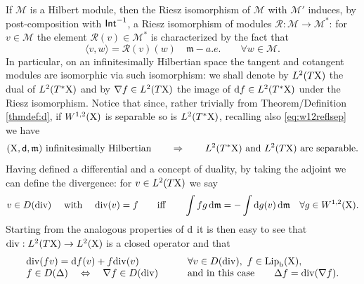\documentclass[11pt]{article}
\numberwithin{equation}{section}
\newcommand{\X}{{\rm X}}
\newcommand{\sfd}{{\sf d}}
\newcommand{\mm}{{\mathfrak m}}
\renewcommand{\d}{{\rm d}}
\renewcommand{\div}{{\rm div}}
\newcommand{\Lip}{{\rm Lip}}
\renewcommand{\b}{{\rm b}}
\newcommand\la{\langle}
\newcommand\ra{\rangle}
\newcommand{\M}{\mathscr M}
\begin{document}
If $\M$ is a Hilbert module, then the Riesz isomorphism of $\M$ with $\M'$ induces, by post-composition with ${\sf Int}^{-1}$, a Riesz isomorphism of modules $\mathscr R:\M\to\M^*$: for $v\in\M$ the element $\mathscr R(v)\in\M^*$ is characterized by the fact that 
\[
\la v,w \ra=\mathscr R(v)(w)\quad\mm-a.e.\qquad\forall w\in\M.
\]
In particular, on an infinitesimally Hilbertian space the tangent and cotangent modules are isomorphic via such isomorphism: we shall denote by $L^2(T\X)$ the dual of $L^2(T^*\X)$ and  by $\nabla f\in L^2(T\X)$  the image of $\d f\in L^2(T^*\X)$ under the Riesz isomorphism. Notice that   since, rather trivially from Theorem/Definition \ref{thmdef:d}, if $W^{1,2}(\X)$ is separable so is $L^2(T^*\X)$, recalling also \eqref{eq:w12reflsep} we have
\begin{equation}
\label{eq:infhilftangsep}
\text{$(\X,\sfd,\mm)$ infinitesimally Hilbertian}\qquad\Rightarrow\qquad\text{$L^2(T^*\X)$ and $L^2(T\X)$ are separable.}
\end{equation}
Having defined a differential and a concept of duality, by taking the adjoint we can define the divergence: for $v\in L^2(T\X)$ we say
\begin{equation}
\label{eq:defdiv}
v\in D(\div)\quad\text{ with }\quad\div (v)=f\qquad\text{iff}\qquad \int fg\,\d\mm=-\int \d g(v)\,\d\mm\quad\forall g\in W^{1,2}(\X).
\end{equation}
Starting from the analogous properties of $\d$ it is then easy to see that $\div:L^2(T\X)\to L^2(\X)$ is a closed operator and that
\begin{equation}
\label{eq:leibdiv}
\begin{array}{ll}
\div(fv)=\d f(v)+f\div(v)&\qquad\forall v\in D(\div),\ f\in\Lip_\b(\X),\\
f\in D(\Delta)\quad\Leftrightarrow\quad \nabla f\in D(\div)&\qquad\text{and in this case}\qquad\Delta f=\div(\nabla f).
\end{array}
\end{equation}
\end{document}
